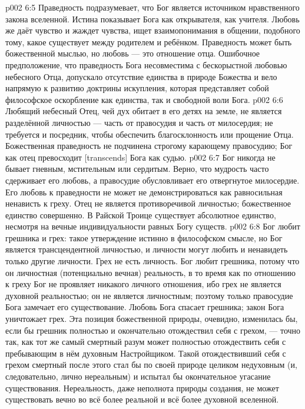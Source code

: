 \vs p002 6:5 \pc Праведность подразумевает, что Бог является источником нравственного закона вселенной. Истина показывает Бога как открывателя, как учителя. Любовь же даёт чувство и жаждет чувства, ищет взаимопонимания в общении, подобного тому, какое существует между родителем и ребёнком. Праведность может быть божественной мыслью, но любовь --- это отношение отца. Ошибочное предположение, что праведность Бога несовместима с бескорыстной любовью небесного Отца, допускало отсутствие единства в природе Божества и вело напрямую к развитию доктрины искупления, которая представляет собой философское оскорбление как единства, так и свободной воли Бога.
\vs p002 6:6 Любящий небесный Отец, чей дух обитает в его детях на земле, не является разделённой личностью --- часть от правосудия и часть от милосердия; не требуется и посредник, чтобы обеспечить благосклонность или прощение Отца. Божественная праведность не подчинена строгому карающему правосудию; Бог как отец превосходит [transcends] Бога как судью.
\vs p002 6:7 \pc Бог никогда не бывает гневным, мстительным или сердитым. Верно, что мудрость часто сдерживает его любовь, а правосудие обусловливает его отвергнутое милосердие. Его любовь к праведности не может не демонстрироваться как равносильная ненависть к греху. Отец не является противоречивой личностью; божественное единство совершенно. В Райской Троице существует абсолютное единство, несмотря на вечные индивидуальности равных Богу существ.
\vs p002 6:8 \pc Бог любит грешника и  грех: такое утверждение истинно в философском смысле, но Бог является трансцендентной личностью, и личности могут любить и ненавидеть только другие личности. Грех не есть личность. Бог любит грешника, потому что он личностная (потенциально вечная) реальность, в то время как по отношению к греху Бог не проявляет никакого личного отношения, ибо грех не является духовной реальностью; он не является личностным; поэтому только правосудие Бога замечает его существование. Любовь Бога спасает грешника; закон Бога уничтожает грех. Эта позиция божественной природы, очевидно, изменилась бы, если бы грешник полностью и окончательно отождествил себя с грехом, --- точно так, как тот же самый смертный разум может полностью отождествить себя с пребывающим в нём духовным Настройщиком. Такой отождествивший себя с грехом смертный после этого стал бы по своей природе целиком недуховным (и, следовательно, лично нереальным) и испытал бы окончательное угасание существования. Нереальность, даже неполнота природы создания, не может существовать вечно во всё более реальной и всё более духовной вселенной.
